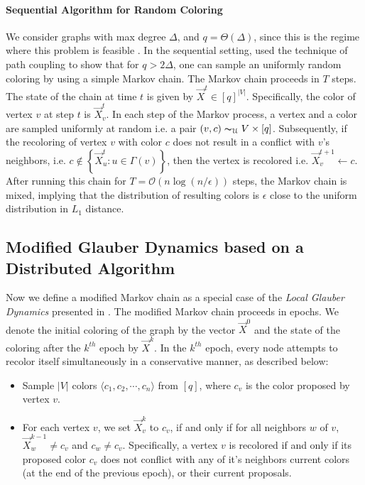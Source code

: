 \paragraph*{Sequential Algorithm for Random Coloring}
\label{par:sequential_algorithm_for_random_coloring}
We consider graphs with max degree $\Delta$, and $q = \Theta(\Delta)$, since this is the regime where this problem is feasible \cite{glauber_survey}.
In the sequential setting, \cite{glauber_survey} used the technique of path coupling to show that for $q > 2\Delta$,
one can sample an uniformly random coloring by using a simple Markov chain.
The Markov chain proceeds in $T$ steps. The state of the chain at time $t$ is given by $\vec X^t\in [q]^{|V|}$.
Specifically, the color of vertex $v$ at step $t$ is $\vec X^t_v$.
In each step of the Markov process, a vertex and a color are sampled uniformly at random i.e. a pair $(v, c)\thicksim_{\mathcal U} V\times [q]$.
Subsequently, if the recoloring of vertex $v$ with color $c$ does not result in a conflict with $v$'s neighbors,
i.e. $c\not\in \left\{ \vec X^t_u : u\in \Gamma(v)\right\}$, then the vertex is recolored i.e. $\vec X_v^{t+1}\leftarrow c$.
After running this chain for $T = \mathcal{O}(n\log (n/\epsilon))$ steps, the Markov chain is mixed,
implying that the distribution of resulting colors is $\epsilon$ close to the uniform distribution in $L_1$ distance.



\subsection{Modified Glauber Dynamics based on a Distributed Algorithm}%
\label{sec:modified_glauber_dynamics}

Now we define a modified Markov chain as a special case of the \emph{Local Glauber Dynamics} presented in \cite{ghaffari_fischer}.
The modified Markov chain proceeds in epochs.
We denote the initial coloring of the graph by the vector $\vec X^0$ and the state of the coloring after the $k^{th}$ epoch by $\vec X^k$.
In the $k^{th}$ epoch, every node attempts to recolor itself simultaneously in a conservative manner, as described below:
\begin{itemize}
    \item Sample $|V|$ colors $ \langle c_1, c_2,\cdots, c_n \rangle$ from $[q]$, where $c_v$ is the color proposed by vertex $v$.
    \item For each vertex $v$, we set $\vec X^k_v$ to $c_v$, if and only if for all neighbors $w$ of $v$, $\vec X^{k-1}_w\not=c_v$ and $c_w\not=c_v$.
Specifically, a vertex $v$ is recolored if and only if its proposed color $c_v$
does not conflict with any of it's neighbors current colors (at the end of the previous epoch), or their current proposals.
\end{itemize}

